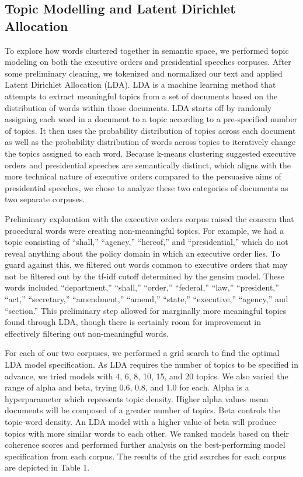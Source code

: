 \documentclass{article}
\begin{document}
{\subsection{Topic Modelling and Latent Dirichlet Allocation}{To explore how words clustered together in semantic space, we performed topic modeling on both the executive orders and presidential speeches corpuses. After some preliminary cleaning, we tokenized and normalized our text and applied Latent Dirichlet Allocation (LDA). LDA is a machine learning method that attempts to extract meaningful topics from a set of documents based on the distribution of words within those documents. LDA starts off by randomly assigning each word in a document to a topic according to a pre-specified number of topics. It then uses the probability distribution of topics across each document as well as the probability distribution of words across topics to iteratively change the topics assigned to each word. 
Because k-means clustering suggested executive orders and presidential speeches are semantically distinct, which aligns with the more technical nature of executive orders compared to the persuasive aims of presidential speeches, we chose to analyze these two categories of documents as two separate corpuses. 

Preliminary exploration with the executive orders corpus raised the concern that procedural words were creating non-meaningful topics. For example, we had a topic consisting of “shall,” “agency,” “hereof,” and “presidential,” which do not reveal anything about the policy domain in which an executive order lies. To guard against this, we filtered out words common to executive orders that may not be filtered out by the tf-idf cutoff determined by the gensim model. These words included “department,” “shall,” “order,” “federal,” “law,” “president,” “act,” “secretary,” “amendment,” “amend,” “state,” “executive,” “agency,” and “section.” This preliminary step allowed for marginally more meaningful topics found through LDA, though there is certainly room for improvement in effectively filtering out non-meaningful words.
 
For each of our two corpuses, we performed a grid search to find the optimal LDA model specification. As LDA requires the number of topics to be specified in advance, we tried models with 4, 6, 8, 10, 15, and 20 topics. We also varied the range of alpha and beta, trying 0.6, 0.8, and 1.0 for each. Alpha is a hyperparameter which represents topic density. Higher alpha values mean documents will be composed of a greater number of topics. Beta controls the topic-word density. An LDA model with a higher value of beta will produce topics with more similar words to each other. We ranked models based on their coherence scores and performed further analysis on the best-performing model specification from each corpus. The results of the grid searches for each corpus are depicted in Table 1. 
	
}}
\end{document}
